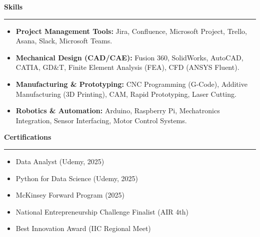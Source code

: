 \documentclass[9pt,letterpaper]{article} %
\newenvironment{rSection}[1]{ %
  \sectionskip
 \textbf{\Large #1} %
  \sectionlineskip
  \hrule %
  \begin{list}{}{ %
    \setlength{\leftmargin}{-0em} %
  }
  \item[]
}{
  \end{list}
}
\def\sectionlineskip{\smallskip} %
\def\sectionskip{} %
\begin{document}
\begin{rSection}{Skills}
\item[] \vspace{-0.5em}
\begin{itemize}[left=-1.5em, labelsep=.1cm, labelwidth=.2cm, itemsep=0.0em]

    \item \textbf{ Project Management Tools:} Jira, Confluence, Microsoft Project, Trello, Asana, Slack, Microsoft Teams.

    \item \textbf{ Mechanical Design (CAD/CAE):} Fusion 360, SolidWorks, AutoCAD, CATIA, GD\&T, Finite Element Analysis (FEA), CFD (ANSYS Fluent).

    \item \textbf{ Manufacturing \& Prototyping:} CNC Programming (G-Code), Additive Manufacturing (3D Printing), CAM, Rapid Prototyping, Laser Cutting.

    \item \textbf{ Robotics \& Automation:} Arduino, Raspberry Pi, Mechatronics Integration, Sensor Interfacing, Motor Control Systems.

\end{itemize}
\end{rSection}

\begin{rSection}{Certifications}
\item[] \vspace{-1em}
\begin{itemize}[left=-1.5em, labelsep=.1cm, labelwidth=.2cm, itemsep=0.0em]

\item Data Analyst (Udemy, 2025)

\item Python for Data Science (Udemy, 2025)

\item McKinsey Forward Program (2025)

\item National Entrepreneurship Challenge Finalist (AIR 4th)

\item Best Innovation Award (IIC Regional Meet)

\end{itemize}
\end{rSection}
\end{document}
